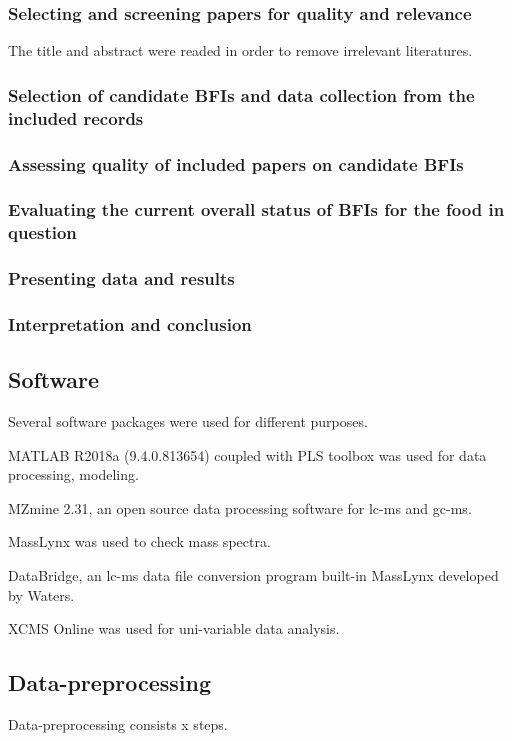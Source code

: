 \subsubsection{Selecting and screening papers for quality and relevance}
The title and abstract were readed in order to remove irrelevant literatures.

\subsubsection{Selection of candidate BFIs and data collection from the included records}

\subsubsection{Assessing quality of included papers on candidate BFIs}


\subsubsection{Evaluating the current overall status of BFIs for the food in question}


\subsubsection{Presenting data and results}


\subsubsection{Interpretation and conclusion}

\subsection{Software}
Several software packages were used for different purposes.

MATLAB R2018a (9.4.0.813654) coupled with PLS toolbox was used for data processing, modeling.

MZmine 2.31, an open source data processing software for \acrshort{lc-ms} and \acrshort{gc-ms}. 

MassLynx was used to check mass spectra.

DataBridge, an \acrshort{lc-ms} data file conversion program built-in MassLynx developed by Waters.

XCMS Online was used for uni-variable data analysis.


\subsection{Data-preprocessing}
Data-preprocessing consists x steps.

